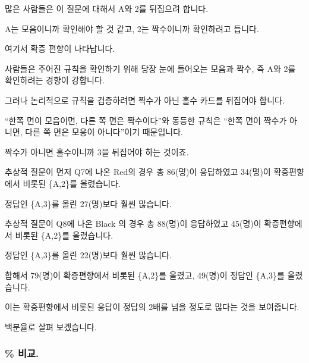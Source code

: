 \documentclass[
]{article}
\begin{document}
많은 사람들은 이 질문에 대해서 A와 2를 뒤집으려 합니다.

A는 모음이니까 확인해야 할 것 같고, 2는 짝수이니까 확인하려고 듭니다.

여기서 확증 편향이 나타납니다.

사람들은 주어진 규칙을 확인하기 위해 당장 눈에 들어오는 모음과 짝수, 즉
A와 2를 확인하려는 경향이 강합니다.

그러나 논리적으로 규칙을 검증하려면 짝수가 아닌 홀수 카드를 뒤집어야
합니다.

``한쪽 면이 모음이면, 다른 쪽 면은 짝수이다''와 동등한 규칙은 ``한쪽
면이 짝수가 아니면, 다른 쪽 면은 모응이 아니다''이기 때문입니다.

짝수가 아니면 홀수이니까 3을 뒤집어야 하는 것이죠.

추상적 질문이 먼저 Q7에 나온 Red의 경우 총 86(명)이 응답하였고 34(명)이
확증편향에서 비롯된 \{A,2\}를 올렸습니다.

정답인 \{A,3\}를 올린 27(명)보다 훨씬 많습니다.

추상적 질문이 Q8에 나온 Black 의 경우 총 88(명)이 응답하였고 45(명)이
확증편향에서 비롯된 \{A,2\}를 올렸습니다.

정답인 \{A,3\}를 올린 22(명)보다 훨씬 많습니다.

합해서 79(명)이 확증편향에서 비롯된 \{A,2\}를 올렸고, 49(명)이 정답인
\{A,3\}를 올렸습니다.

이는 확증편향에서 비롯된 응답이 정답의 2배를 넘을 정도로 많다는 것을
보여줍니다.

백분율로 살펴 보겠습니다.

\subsubsection{\% 비교.}\label{uxbe44uxad50.-1}
\end{document}
